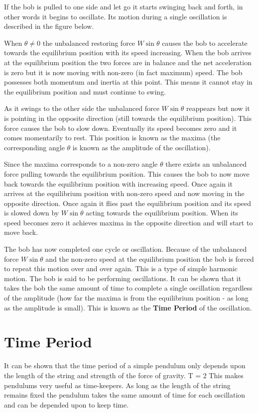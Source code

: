    If the bob is pulled to one side and let go it starts swinging back and forth, in other words it begins to oscillate. Its motion during a single oscillation is described in the figure below.

   \vspace{0.5\baselineskip}
   
   \vspace{0.2\baselineskip}

   When $\theta \neq 0$ the unbalanced restoring force $W \sin \theta$ causes the bob to accelerate towards the equilibrium position with its speed increasing. When the bob arrives at the equilibrium position the two forces are in balance and the net acceleration is zero but it is now moving with non-zero (in fact maximum) speed. The bob possesses both momentum and inertia at this point. This means it cannot stay in the equilibrium position and must continue to swing.

   As it swings to the other side the unbalanced force $W \sin \theta$ reappears but now it is pointing in the opposite direction (still towards the equilibrium position). This force causes the bob to slow down. Eventually its speed becomes zero and it comes momentarily to rest. This position is known as the maxima (the corresponding angle $\theta$ is known as the amplitude of the oscillation).

   Since the maxima corresponds to a non-zero angle $\theta$ there exists an unbalanced force pulling towards the equilibrium position. This causes the bob to now move back towards the equilibrium position with increasing speed. Once again it arrives at the equilibrium position with non-zero speed and now moving in the opposite direction. Once again it flies past the equilibrium position and its speed is slowed down by $W \sin \theta$ acting towards the equilibrium position. When its speed becomes zero it achieves maxima in the opposite direction and will start to move back.

   The bob has now completed one cycle or oscillation. Because of the unbalanced force $W \sin \theta$ and the non-zero speed at the equilibrium position the bob is forced to repeat this motion over and over again. This is a type of simple harmonic motion. The bob is said to be performing oscillations. It can be shown that it takes the bob the same amount of time to complete a single oscillation regardless of the amplitude (how far the maxima is from the equilibrium position - as long as the amplitude is small). This is known as the \textbf{Time Period} of the oscillation.

\section{Time Period}

   It can be shown that the time period of a simple pendulum only depends upon the length of the string and strength of the force of gravity.
   \beq
      T = 2 \pi {}
   \eeq
   This makes pendulums very useful as time-keepers. As long as the length of the string remains fixed the pendulum takes the same amount of time for each oscillation and can be depended upon to keep time.

